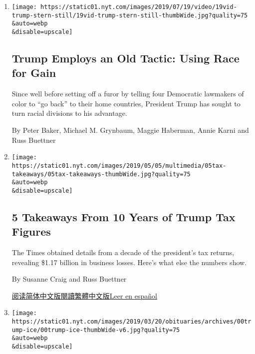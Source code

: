 \begin{enumerate}
\def\labelenumi{\arabic{enumi}.}
\item
  \href{/2019/07/20/us/politics/trump-race-record.html}{}

  \texttt{[image: https://static01.nyt.com/images/2019/07/19/video/19vid-trump-stern-still/19vid-trump-stern-still-thumbWide.jpg?quality=75\\\&auto=webp\\\&disable=upscale]}

  \hypertarget{trump-employs-an-old-tactic-using-race-for-gain}{%
  \subsection{Trump Employs an Old Tactic: Using Race for
  Gain}\label{trump-employs-an-old-tactic-using-race-for-gain}}

  Since well before setting off a furor by telling four Democratic
  lawmakers of color to ``go back'' to their home countries, President
  Trump has sought to turn racial divisions to his advantage.

  By Peter Baker, Michael M. Grynbaum, Maggie Haberman, Annie Karni and
  Russ Buettner
\item
  \href{/2019/05/07/us/trump-tax-figures.html}{}

  \texttt{[image: https://static01.nyt.com/images/2019/05/05/multimedia/05tax-takeaways/05tax-takeaways-thumbWide.jpg?quality=75\\\&auto=webp\\\&disable=upscale]}

  \hypertarget{5-takeaways-from-10-years-of-trump-tax-figures}{%
  \subsection{5 Takeaways From 10 Years of Trump Tax
  Figures}\label{5-takeaways-from-10-years-of-trump-tax-figures}}

  The Times obtained details from a decade of the president's tax
  returns, revealing \$1.17 billion in business losses. Here's what else
  the numbers show.

  By Susanne Craig and Russ Buettner

  \href{https://cn.nytimes.com/usa/20190508/trump-tax-figures/}{阅读简体中文版}\href{https://cn.nytimes.com/usa/20190508/trump-tax-figures/zh-hant/}{閱讀繁體中文版}\href{https://www.nytimes.com/es/2019/05/08/trump-declaraciones-impuestos/}{Leer
  en español}
\item
  \href{/interactive/2019/05/07/us/politics/donald-trump-taxes.html}{}

  \texttt{[image: https://static01.nyt.com/images/2019/03/20/obituaries/archives/00trump-ice/00trump-ice-thumbWide-v6.jpg?quality=75\\\&auto=webp\\\&disable=upscale]}


\end{enumerate}
